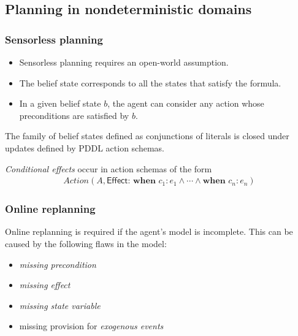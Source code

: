 \documentclass{article}
\begin{document}
\subsection{Planning in nondeterministic domains}

\subsubsection{Sensorless planning}

\begin{itemize}
	\item Sensorless planning requires an open-world assumption.
	\item The belief state corresponds to all the states that satisfy the formula.
	\item In a given belief state $b$, the agent can consider any action whose preconditions are satisfied by $b$.
\end{itemize}

\begin{theorem}[R\&N p. 418]
	The family of belief states defined as conjunctions of literals is closed under updates defined by PDDL
	action schemas.
\end{theorem}

\begin{definition}
	\emph{Conditional effects} occur in action schemas of the form
	\begin{align*}
		Action(A,
		\textsf{Effect:}\textbf{ when }c_1: e_1 \wedge \cdots \wedge \textbf{when }c_n: e_n)
	\end{align*}
\end{definition}

\subsubsection{Online replanning}

\begin{definition}[R\&N p. 423]
	Online replanning is required if the agent's model is incomplete.
	This can be caused by the following flaws in the model:
	\begin{itemize}
		\item \emph{missing precondition}
		\item \emph{missing effect}
		\item \emph{missing state variable}
		\item missing provision for \emph{exogenous events}
	\end{itemize}
\end{definition}
\end{document}
